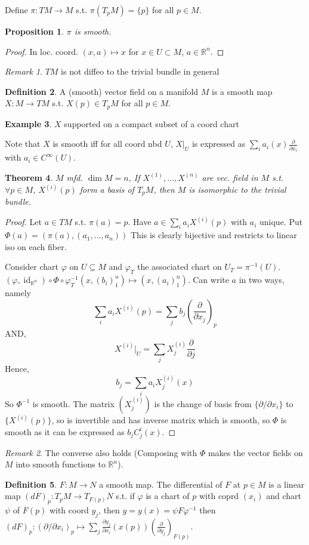 \documentclass{article}
\theoremstyle{definition}
\newtheorem{defn}{Definition}[section]
\newtheorem{example}[defn]{Example}
\theoremstyle{remark}
\newtheorem{rem}{Remark}
\theoremstyle{plain}
\newtheorem{thm}[defn]{Theorem}
\newtheorem{prop}[defn]{Proposition}
\newcommand{\RR}{\mathbb{R}}
\begin{document}
Define $\pi:TM\to M$ s.t. $\pi(T_pM)=\{p\}$ for all $p\in M$.
\begin{prop}
    $\pi$ is smooth.
\end{prop}
\begin{proof}
    In loc. coord. $(x,a)\mapsto x$ for $x\in U\subset M$, $a\in \RR^n$.
\end{proof}
\begin{rem}
    $TM$ is not diffeo to the trivial bundle in general
\end{rem}
\begin{defn}
    A (smooth) vector field on a manifold $M$ is a smooth map $X:M\to TM$ s.t. $X(p)\in T_pM$ for all $p\in M$.
\end{defn}
\begin{example}
    $X$ supported on a compact subset of a coord chart
\end{example}
Note that $X$ is smooth iff for all coord nbd $U$, $X|_U$ is expressed as $\sum_ia_i(x)\frac{\partial}{\partial x_i}$ with $a_i\in C^\infty(U)$.
\begin{thm}
    $M$ mfd. $\dim M=n$, If $X^{(1)},...,X^{(n)}$ are vec. field in $M$ s.t. $\forall p\in M$, $X^{(i)}(p)$ form a basis of $T_pM$, then $M$ is isomorphic to the trivial bundle.
\end{thm}
\begin{proof}
    Let $a\in TM$ s.t. $\pi(a)=p$. Have $a\in \sum_ia_iX^{(i)}(p)$ with $a_i$ unique. Put $\Phi(a)=(\pi(a),(a_1,...,a_n))$ This is clearly bijective and restricts to linear iso on each fiber.

    Consider chart $\varphi$ on $U\subseteq M$ and $\varphi_T$ the associated chart on $U_T=\pi^{-1}(U)$. $(\varphi,\operatorname{id}_{\RR^n})\circ\Phi\circ\varphi_T^{-1}(x,(b_i)_1^n)\mapsto(x,(a_i)_1^n)$.
    Can write $a$ in two ways, namely
    \[\sum_ia_iX^{(i)}(p)=\sum_jb_j\left(\dfrac{\partial}{\partial x_j}\right)_p\]
    AND,
    \[X^{(i)}|_U=\sum_jX_j^{(i)}\dfrac{\partial}{\partial j}\]
    Hence,
    \[b_j=\sum_i a_i X^{(i)}_j(x)\]
    So $\Phi^{-1}$ is smooth. The matrix $(X^{(i)}_j)$ is the change of basis from $\{\partial/\partial x_i\}$ to $\{X^{(i)}(p)\}$, so is invertible and has inverse matrix which is smooth, so $\Phi$ is smooth as it can be expressed as $b_jC_j^i(x)$.
\end{proof}
\begin{rem}
    The converse also holds (Composing with $\Phi$ makes the vector fields on $M$ into smooth functions to $\RR^n$).
\end{rem}
\begin{defn}
    $F:M\to N$ a smooth map. The differential of $F$ at $p\in M$ is a linear map $(dF)_p:T_pM\to T_{F(p)}N$ s.t. if $\varphi$ is a chart of $p$ with coprd $(x_i)$ and  chart $\psi$ of $F(p)$ with coord $y_j$, then $y=y(x)=\psi F\varphi^{-1}$ then $(dF)_p:(\partial/\partial x_i)_p\mapsto \sum_j\frac{\partial y_j}{\partial x_i}(x(p))(\frac{\partial}{\partial y_j})_{F(p)}$.
\end{defn}
\end{document}
